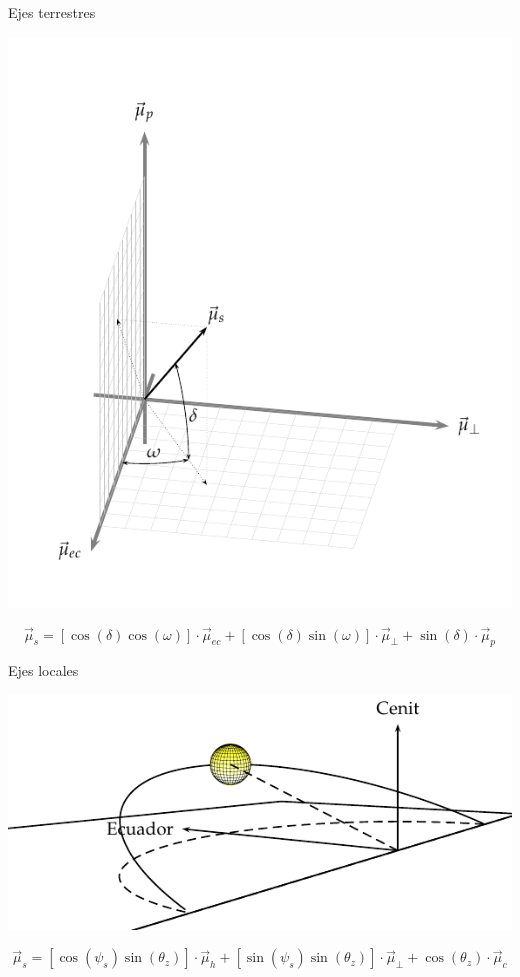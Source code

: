 \documentclass[xcolor={usenames,svgnames,dvipsnames}]{beamer}
\begin{document}
\begin{frame}[label={sec:org9d77d56}]{Ejes terrestres}
\begin{center}
\includegraphics[height=0.7\textheight]{../figs/SistemaCoordenadasTerrestre.pdf}
\end{center}


\[\vec{\mu}_{s}=\left[\cos\left(\delta\right)\cos\left(\omega\right)\right]\cdot\vec{\mu}_{ec}+\left[\cos\left(\delta\right)\sin\left(\omega\right)\right]\cdot\vec{\mu}_{\bot}+\sin\left(\delta\right)\cdot\vec{\mu}_{p}\]
\end{frame}


\begin{frame}[label={sec:org30ebd72}]{Ejes locales}
\begin{center}
\includegraphics[width=.9\linewidth]{../figs/SoldesdeTierra2.pdf}
\end{center}

\[\vec{\mu}_{s}=\left[\cos\left(\psi_{s}\right)\sin\left(\theta_{z}\right)\right]\cdot\vec{\mu}_{h}+\left[\sin\left(\psi_{s}\right)\sin\left(\theta_{z}\right)\right]\cdot\vec{\mu}_{\bot}+\cos\left(\theta_{z}\right)\cdot\vec{\mu}_{c}\]
\end{frame}
\end{document}
